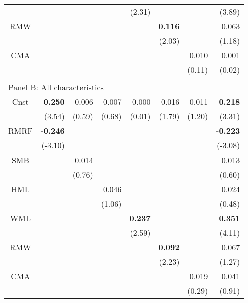 \begin{singlespacing}
\begin{table}[H]
\begin{tabular}{crrrrrrr}
     &                 &         &        & (2.31)         &                &        & (3.89)          \\
RMW  &                 &         &        &                & \textbf{0.116} &        & 0.063           \\
     &                 &         &        &                & (2.03)         &        & (1.18)          \\
CMA  &                 &         &        &                &                & 0.010  & 0.001           \\
     &                 &         &        &                &                & (0.11) & (0.02)          \\
     &                 &         &        &                &                &        &                 \\
\multicolumn{8}{l}{Panel B: All characteristics}                                                      \\
Cnst & \textbf{0.250}  & 0.006   & 0.007  & 0.000          & 0.016          & 0.011  & \textbf{0.218}  \\
     & (3.54)          & (0.59)  & (0.68) & (0.01)         & (1.79)         & (1.20) & (3.31)          \\
RMRF & \textbf{-0.246} &         &        &                &                &        & \textbf{-0.223} \\
     & (-3.10)         &         &        &                &                &        & (-3.08)         \\
SMB  &                 & 0.014   &        &                &                &        & 0.013           \\
     &                 & (0.76)  &        &                &                &        & (0.60)          \\
HML  &                 &         & 0.046  &                &                &        & 0.024           \\
     &                 &         & (1.06) &                &                &        & (0.48)          \\
WML  &                 &         &        & \textbf{0.237} &                &        & \textbf{0.351}  \\
     &                 &         &        & (2.59)         &                &        & (4.11)          \\
RMW  &                 &         &        &                & \textbf{0.092} &        & 0.067           \\
     &                 &         &        &                & (2.23)         &        & (1.27)          \\
CMA  &                 &         &        &                &                & 0.019  & 0.041           \\
     &                 &         &        &                &                & (0.29) & (0.91)          \\ \hline
\end{tabular}
\end{table}
\end{singlespacing}